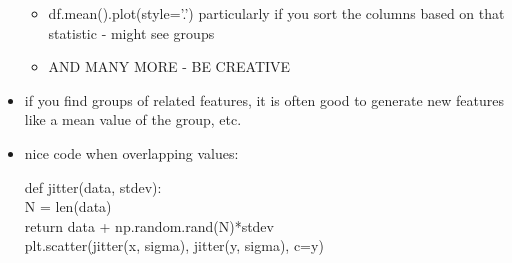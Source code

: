 \documentclass[a4paper]{report}
\newcommand{\brown}{\color{brown}}
\newenvironment{tightcenter}{
  \setlength\topsep{0pt}
  \setlength\parskip{0pt}
  \begin{center}
  }{
  \end{center}
}
\newenvironment{codesnip}[1]
{\begin{tightcenter}\begin{minipage}{.85\textwidth}#1}
{\end{minipage}\end{tightcenter}}
\begin{document}
\begin{itemize}
\begin{itemize}
      \item {\color{brown} df.mean().plot(style='.') }
	\subitem particularly if you sort the columns based on that statistic - might see groups
      \item AND MANY MORE - BE CREATIVE
    \end{itemize}
  \item if you find groups of related features, it is often good to generate new features like a mean value of the group, etc.
  \item nice code when overlapping values:\\
    \begin{codesnip}{\brown}
    def jitter(data, stdev):\\
    \hspace*{1cm} N  = len(data)\\
    \hspace*{1cm} return data + np.random.rand(N)*stdev\\
	plt.scatter(jitter(x, sigma), jitter(y, sigma), c=y)
      \end{codesnip}
\end{itemize}
\end{document}
